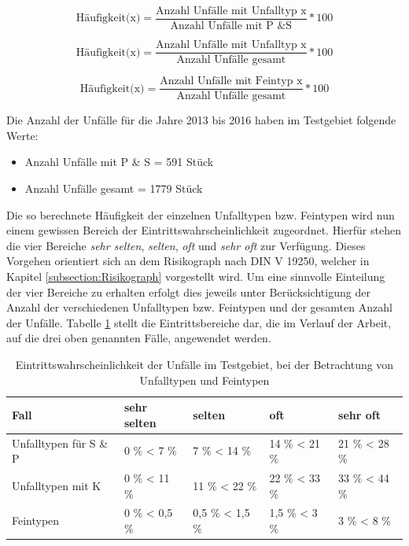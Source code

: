 \begin{equation}\label{equation:Häufigkeit(1)}
\text{Häufigkeit(x)} = \dfrac{\text{Anzahl Unfälle mit Unfalltyp x}}{\text{Anzahl Unfälle mit P \& S}}*100
\end{equation}

\begin{equation}\label{equation:Häufigkeit(2)}
\text{Häufigkeit(x)} = \dfrac{\text{Anzahl Unfälle mit Unfalltyp x}}{\text{Anzahl Unfälle gesamt}}*100
\end{equation}

\begin{equation}\label{equation:Häufigkeit(3)}
\text{Häufigkeit(x)} = \dfrac{\text{Anzahl Unfälle mit Feintyp x}}{\text{Anzahl Unfälle gesamt}}*100
\end{equation}

Die Anzahl der Unfälle für die Jahre 2013 bis 2016 haben im Testgebiet folgende Werte:

\begin{itemize}
	\item Anzahl Unfälle mit P \& S = 591 Stück
	\item Anzahl Unfälle gesamt = 1779 Stück
\end{itemize}

Die so berechnete Häufigkeit der einzelnen Unfalltypen bzw. Feintypen wird nun einem gewissen Bereich der Eintrittswahrscheinlichkeit zugeordnet. Hierfür stehen die vier Bereiche \textit{sehr selten}, \textit{selten}, \textit{oft} und \textit{sehr oft} zur Verfügung. Dieses Vorgehen orientiert sich an dem Risikograph nach DIN V 19250, welcher in Kapitel \ref{subsection:Risikograph} vorgestellt wird. Um eine sinnvolle Einteilung der  vier Bereiche zu erhalten erfolgt dies jeweils unter Berücksichtigung der Anzahl der verschiedenen Unfalltypen bzw. Feintypen und der gesamten Anzahl der Unfälle. Tabelle \ref{tab:Haeufigkeits Bereiche} stellt die Eintrittsbereiche dar, die im Verlauf der Arbeit, auf die drei oben genannten Fälle, angewendet werden.

\begin{table}[htpb]
	\scriptsize
	\caption[Eintrittswahrscheinlichkeit der Unfälle im Testgebiet, bei der Betrachtung von Unfalltypen und Feintypen]{Eintrittswahrscheinlichkeit der Unfälle im Testgebiet, bei der Betrachtung von Unfalltypen und Feintypen}\label{tab:Haeufigkeits Bereiche}
	\centering
	\begin{tabular}{l l l  l l}
		\toprule
		Fall & sehr selten & selten & oft & sehr oft \\
		\midrule
		Unfalltypen für S \& P & 0 \% < 7 \%  & 7 \% < 14 \% & 14 \% < 21 \% & 21 \% < 28 \%\\
		Unfalltypen mit K & 0 \% < 11 \%  & 11 \% < 22 \% & 22 \% < 33 \% & 33 \% < 44 \%\\
		Feintypen & 0 \% < 0,5 \% & 0,5 \% < 1,5 \% & 1,5 \% < 3 \% & 3 \% < 8 \%\\
		\bottomrule
	\end{tabular}
\end{table}

